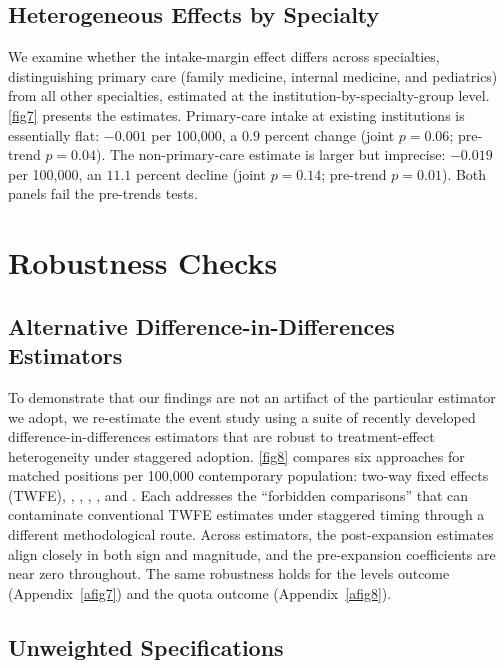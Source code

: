 \subsection{Heterogeneous Effects by Specialty}\label{subsec:specialty}

We examine whether the intake-margin effect differs across specialties, distinguishing primary care (family medicine, internal medicine, and pediatrics) from all other specialties, estimated at the institution-by-specialty-group level. \cref{fig7} presents the estimates. Primary-care intake at existing institutions is essentially flat: $-0.001$ per 100{,}000, a $0.9$ percent change (joint $p = 0.06$; pre-trend $p = 0.04$). The non-primary-care estimate is larger but imprecise: $-0.019$ per 100{,}000, an $11.1$ percent decline (joint $p = 0.14$; pre-trend $p = 0.01$). Both panels fail the pre-trends tests.

\section{Robustness Checks}\label{sec:checks}

\subsection{Alternative Difference-in-Differences Estimators}\label{subsec:estimators}

To demonstrate that our findings are not an artifact of the particular estimator we adopt, we re-estimate the event study using a suite of recently developed difference-in-differences estimators that are robust to treatment-effect heterogeneity under staggered adoption. \cref{fig8} compares six approaches for matched positions per 100{,}000 contemporary population: two-way fixed effects (TWFE), \textcite{borusyak2024revisiting}, \textcite{de2020two}, \textcite{sun2021estimating}, \textcite{cengiz2019effect}, and \textcite{gardner2022two}. Each addresses the ``forbidden comparisons'' that can contaminate conventional TWFE estimates under staggered timing through a different methodological route. Across estimators, the post-expansion estimates align closely in both sign and magnitude, and the pre-expansion coefficients are near zero throughout. The same robustness holds for the levels outcome (Appendix~\cref{afig7}) and the quota outcome (Appendix~\cref{afig8}).

\subsection{Unweighted Specifications}\label{subsec:unweighted}

